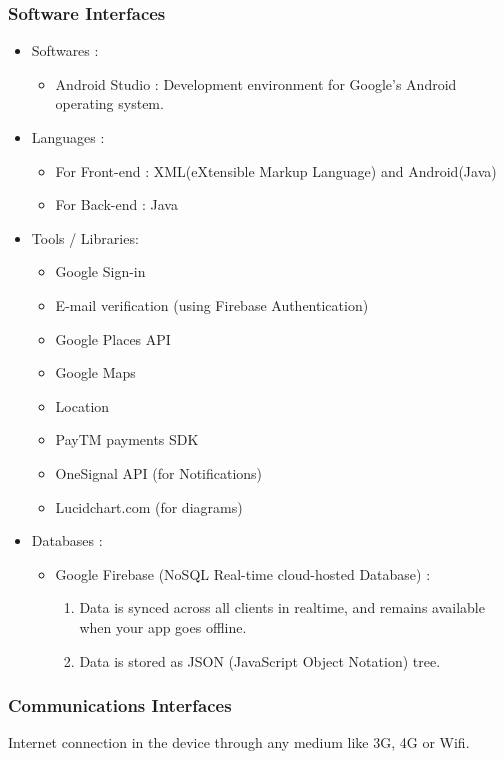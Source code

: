 \documentclass{report}
\begin{document}
\subsubsection{Software Interfaces}
\begin{itemize}[label=$\diamond$]
\item Softwares :
\begin{itemize}[label=$\rightarrow$]
\item Android Studio : Development environment for Google's Android operating system.
\end{itemize}
\item Languages :
\begin{itemize}[label=$\rightarrow$]
\item For Front-end : XML(eXtensible Markup Language) and Android(Java)
\item For Back-end : Java
\end{itemize}

\item Tools / Libraries:
\begin{itemize}[label=$\rightarrow$]
\item Google Sign-in
\item E-mail verification (using Firebase Authentication)
\item Google Places API
\item Google Maps
\item Location
\item PayTM payments SDK
\item OneSignal API (for Notifications)
\item Lucidchart.com (for diagrams)
\end{itemize}

\item Databases :
\begin{itemize}[label=$\rightarrow$]
\item Google Firebase (NoSQL Real-time cloud-hosted Database) :
\begin{enumerate}
\item Data is synced across all clients in realtime, and remains available when your app goes offline.
\item Data is stored as JSON (JavaScript Object Notation) tree.
\end{enumerate}
\end{itemize}

\end{itemize}

\subsubsection{Communications Interfaces}
Internet connection in the device through any medium like 3G, 4G or Wifi.
\end{document}
